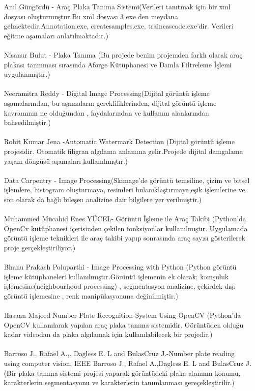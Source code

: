 Anıl Güngördü - Araç Plaka Tanıma Sistemi(Verileri tanıtmak için bir xml dosyası oluşturmuştur.Bu xml dosyası 3 exe den meydana gelmektedir.Annotation.exe, createsamples.exe, traincascade.exe’dir. Verileri eğitme aşamaları anlatılmaktadır.)  
\\ \\
Nisanur Bulut - Plaka Tanıma (Bu projede benim projemden farklı olarak araç plakası tanınması sırasında Aforge Kütüphanesi ve Damla Filtreleme İşlemi uygulanmıştır.)  
\\ \\
Neeramitra Reddy - Digital Image Processing(Dijital görüntü işleme aşamalarından, bu aşamaların gerekliliklerinden, dijital görüntü işleme kavramının ne olduğundan , faydalarından ve kullanım alanlarından bahsedilmiştir.)
\\ \\
Rohit Kumar Jena -Automatic Watermark Detection (Dijital görüntü işleme projesidir. Otomatik filigran algılama anlamına gelir.Projede dijital damgalama yaşam döngüsü aşamaları kullanılmıştır.)
\\ \\
Data Carpentry - Image Processing(Skimage'de görüntü temsiline, çizim ve bitsel işlemlere, histogram oluşturmaya, resimleri bulanıklaştırmaya,eşik işlemlerine ve son olarak da bağlı bileşen analizine dair bilgilere yer verilmiştir.) 
\\ \\
Muhammed Mücahid Enes YÜCEL- Görüntü İşleme ile Araç Takibi (Python'da OpenCv kütüphanesi içerisinden çekilen fonksiyonlar kullanılmıştır. Uygulamada görüntü işleme teknikleri ile araç takibi yapıp sonrasında araç sayısı gösterilerek proje gerçekleştiriliyor.)
\\ \\
Bhanu Prakash Poluparthi - Image Processing with Python (Python görüntü işleme kütüphaneleri kullanılmıştır.Görüntü işlemenin ek olarak; komşuluk işlemesine(neighbourhood processing) , segmentasyon analizine, çekirdek dışı görüntü işlemesine , renk manipülasyonuna değinilmiştir.)
\\ \\
Hasaan Majeed-Number Plate Recognition System Using OpenCV (Python'da OpenCV kullanılarak yapılan araç plaka tanıma sistemidir. Görüntüden olduğu kadar videodan da plaka algılamak için kullanılabilecek bir projedir.)
\\ \\
Barroso J., Rafael A.,. Dagless E. L and BulasCruz J.-Number plate reading using computer vision, IEEE Barroso J., Rafael A.,Dagless E. L and BulasCruz J.(Bir plaka tanıma sistemi projesi yaparak görüntüdeki plaka alanının konumu, karakterlerin segmentasyonu ve karakterlerin tanımlanması gereçekleştirilir.)
